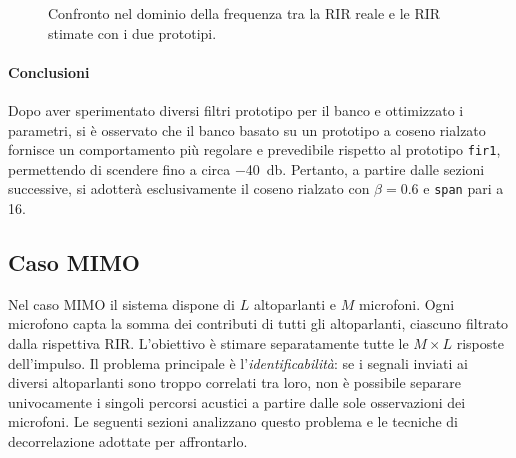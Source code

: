 \documentclass[11pt,a4paper]{article}
\begin{document}
	\begin{figure}[H]
		\centering
		\caption{Confronto nel dominio della frequenza tra la RIR reale e le RIR stimate con i due prototipi.}
		\label{fig:rir_spectrum}
	\end{figure}
	
	\paragraph{Conclusioni}
	Dopo aver sperimentato diversi filtri prototipo per il banco e ottimizzato i parametri, si è osservato che il banco basato su un prototipo a coseno rialzato fornisce un comportamento più regolare e prevedibile rispetto al prototipo \texttt{fir1}, permettendo di scendere fino a circa \SI{-40}{\decibel}.
	Pertanto, a partire dalle sezioni successive, si adotterà esclusivamente il coseno rialzato con $\beta=0.6$ e \texttt{span} pari a 16.
	
	\subsection{Caso MIMO}
	Nel caso MIMO il sistema dispone di $L$ altoparlanti e $M$ microfoni.
	Ogni microfono capta la somma dei contributi di tutti gli altoparlanti, ciascuno filtrato dalla rispettiva RIR.
	L'obiettivo è stimare separatamente tutte le $M \times L$ risposte dell'impulso.
	Il problema principale è l'\emph{identificabilità}: se i segnali inviati ai diversi altoparlanti sono troppo correlati tra loro, non è possibile separare univocamente i singoli percorsi acustici a partire dalle sole osservazioni dei microfoni.
	Le seguenti sezioni analizzano questo problema e le tecniche di decorrelazione adottate per affrontarlo.
	
\end{document}

